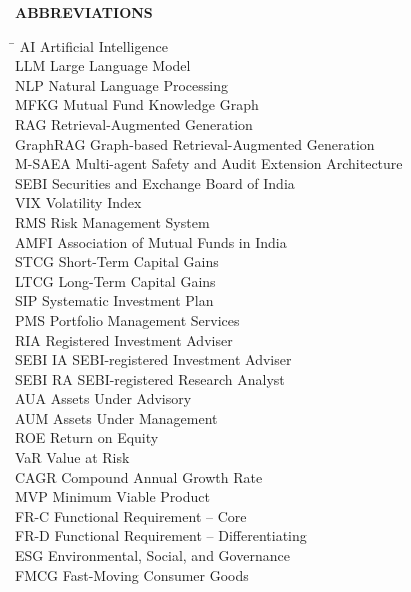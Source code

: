 \documentclass[12pt, a4paper, openany, oneside]{report}
\begin{document}
\begin{center}
\textbf{{\huge ABBREVIATIONS}}
\vspace{0.5cm}
\begin{tabbing}
    \hspace*{4.5cm} \= \kill
    AI          \> Artificial Intelligence \\
    LLM         \> Large Language Model \\
    NLP         \> Natural Language Processing \\
    MFKG        \> Mutual Fund Knowledge Graph \\
    RAG         \> Retrieval-Augmented Generation \\
    GraphRAG    \> Graph-based Retrieval-Augmented Generation \\
    M-SAEA      \> Multi-agent Safety and Audit Extension Architecture \\
    SEBI        \> Securities and Exchange Board of India \\
    VIX         \> Volatility Index \\
    RMS         \> Risk Management System \\
    AMFI        \> Association of Mutual Funds in India \\
    STCG        \> Short-Term Capital Gains \\
    LTCG        \> Long-Term Capital Gains \\
    SIP         \> Systematic Investment Plan \\
    PMS         \> Portfolio Management Services \\
    RIA         \> Registered Investment Adviser \\
    SEBI IA     \> SEBI-registered Investment Adviser \\
    SEBI RA     \> SEBI-registered Research Analyst \\
    AUA         \> Assets Under Advisory \\
    AUM         \> Assets Under Management \\
    ROE         \> Return on Equity \\
    VaR         \> Value at Risk \\
    CAGR        \> Compound Annual Growth Rate \\
    MVP         \> Minimum Viable Product \\
    FR-C        \> Functional Requirement -- Core \\
    FR-D        \> Functional Requirement -- Differentiating \\
    ESG         \> Environmental, Social, and Governance \\
    FMCG        \> Fast-Moving Consumer Goods \\
\end{tabbing}
\end{center}
\cleardoublepage
\end{document}
